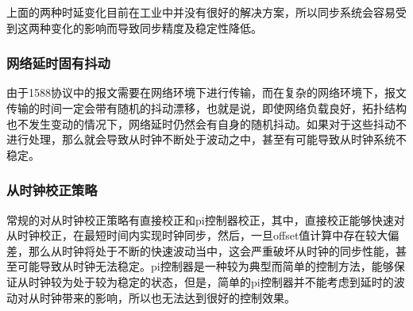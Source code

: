 上面的两种时延变化目前在工业中并没有很好的解决方案，所以同步系统会容易受到这两种变化的影响而导致同步精度及稳定性降低。

\subsubsection{网络延时固有抖动}
\label{sec:1588_problem_route_time_delay}
由于1588协议中的报文需要在网络环境下进行传输，而在复杂的网络环境下，报文传输的时间一定会带有随机的抖动漂移，也就是说，即使网络负载良好，拓扑结构也不发生变动的情况下，网络延时仍然会有自身的随机抖动。如果对于这些抖动不进行处理，那么就会导致从时钟不断处于波动之中，甚至有可能导致从时钟系统不稳定。

\subsubsection{从时钟校正策略}
\label{sec:1588_problem_slave_clock_control}
常规的对从时钟校正策略有直接校正和pi控制器校正，其中，直接校正能够快速对从时钟校正，在最短时间内实现时钟同步，然后，一旦offset值计算中存在较大偏差，那么从时钟将处于不断的快速波动当中，这会严重破坏从时钟的同步性能，甚至可能导致从时钟无法稳定。pi控制器是一种较为典型而简单的控制方法，能够保证从时钟较为处于较为稳定的状态，但是，简单的pi控制器并不能考虑到延时的波动对从时钟带来的影响，所以也无法达到很好的控制效果。

